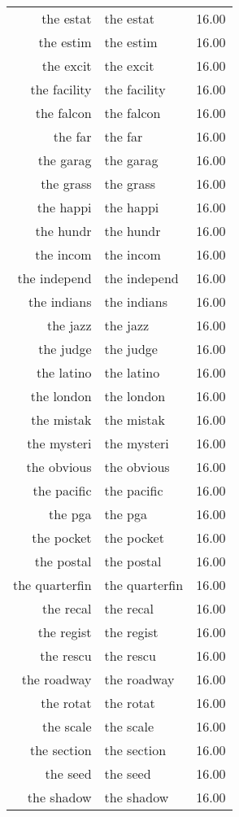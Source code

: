 \begin{table}[ht]
\begin{tabular}{rlr}
  the estat & the estat & 16.00 \\ 
  the estim & the estim & 16.00 \\ 
  the excit & the excit & 16.00 \\ 
  the facility & the facility & 16.00 \\ 
  the falcon & the falcon & 16.00 \\ 
  the far & the far & 16.00 \\ 
  the garag & the garag & 16.00 \\ 
  the grass & the grass & 16.00 \\ 
  the happi & the happi & 16.00 \\ 
  the hundr & the hundr & 16.00 \\ 
  the incom & the incom & 16.00 \\ 
  the independ & the independ & 16.00 \\ 
  the indians & the indians & 16.00 \\ 
  the jazz & the jazz & 16.00 \\ 
  the judge & the judge & 16.00 \\ 
  the latino & the latino & 16.00 \\ 
  the london & the london & 16.00 \\ 
  the mistak & the mistak & 16.00 \\ 
  the mysteri & the mysteri & 16.00 \\ 
  the obvious & the obvious & 16.00 \\ 
  the pacific & the pacific & 16.00 \\ 
  the pga & the pga & 16.00 \\ 
  the pocket & the pocket & 16.00 \\ 
  the postal & the postal & 16.00 \\ 
  the quarterfin & the quarterfin & 16.00 \\ 
  the recal & the recal & 16.00 \\ 
  the regist & the regist & 16.00 \\ 
  the rescu & the rescu & 16.00 \\ 
  the roadway & the roadway & 16.00 \\ 
  the rotat & the rotat & 16.00 \\ 
  the scale & the scale & 16.00 \\ 
  the section & the section & 16.00 \\ 
  the seed & the seed & 16.00 \\ 
  the shadow & the shadow & 16.00 \\ 

\end{tabular}
\end{table}
